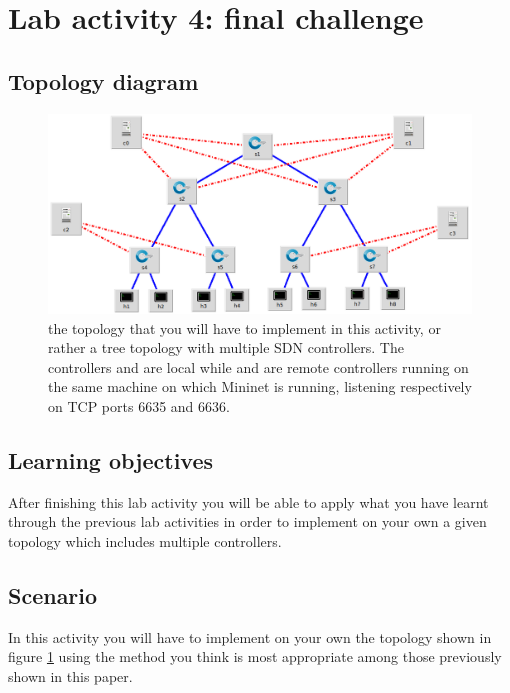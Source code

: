 \section*{Lab activity 4: final challenge}

\subsection*{Topology diagram}
\begin{figure}[htb]
	\centering
	\includegraphics[width=1\linewidth]{img/challange-topology.png}
	\caption{the topology that you will have to implement in this activity, or rather
  a tree topology with multiple SDN controllers.
  The controllers  and  are local while  and 
  are remote controllers running on the same machine on which Mininet is running,
	listening respectively on TCP ports 6635 and 6636.}
	\label{fig:challenge-topology}
\end{figure}




\subsection*{Learning objectives}
After finishing this lab activity you will be able to apply what you have learnt
through the previous lab activities in order to implement on your own a given
topology which includes multiple controllers.





\subsection*{Scenario}
In this activity you will have to implement on your own the topology shown in
figure \ref{fig:challenge-topology} using the method you think is most appropriate
among those previously shown in this paper.

